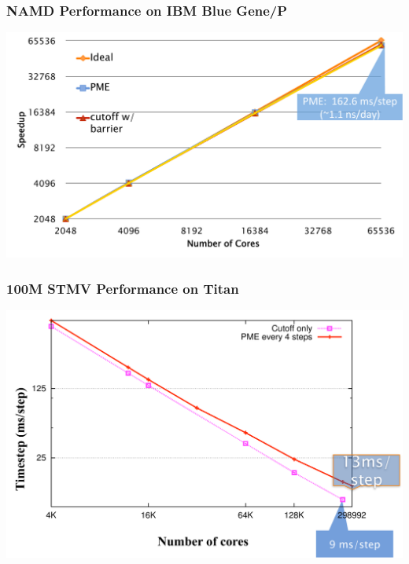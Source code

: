 \begin{frame}[t]
\frametitle{NAMD Performance on IBM Blue Gene/P}
  \begin{center} \includegraphics[width=.8\textwidth]{figures/namd_bgp.pdf} \end{center}
\end{frame}

\begin{frame}[t]
\frametitle{100M STMV Performance on Titan}
  \begin{center} \includegraphics[width=.8\textwidth]{figures/namd_titan.pdf} \end{center}
\end{frame}

